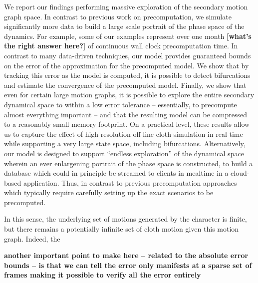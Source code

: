 We report our findings performing massive exploration of the secondary motion graph space. In contrast to previous work on precomputation, we simulate significantly more data to build a large scale portrait of the phase space of the dynamics. For example, some of our examples represent over one month \textbf{[what's the right answer here?]} of continuous wall clock precomputation time. In contrast to many data-driven techniques, our model provides guaranteed bounds on the error of the approximation for the precomputed model. We show that by tracking this error as the model is computed, it is possible to detect bifurcations and estimate the convergence of the precomputed model. Finally, we show that even for certain large motion graphs, it is possible to explore the entire secondary dynamical space to within a low error tolerance -- essentially, to precompute almost everything important -- and that the resulting model can be compressed to a reasonably small memory footprint. On a practical level, these results allow us to capture the effect of high-resolution off-line cloth simulation in real-time while supporting a very large state space, including bifurcations. Alternatively, our model is designed to support ``endless exploration'' of the dynamical space wherein an ever enlargening portrait of the phase space is constructed, to build a database which could in principle be streamed to clients in mealtime in a cloud-based application. Thus, in contrast to previous precomputation approaches which typically require carefully setting up the exact scenarios to be precomputed.

In this sense, the underlying set of motions generated by the character is finite, but there remains a potentially infinite set of cloth motion given this motion graph. Indeed, the 

\textbf{another important point to make here -- related to the absolute error bounds -- is that we can tell the error only manifests at a sparse set of frames making it possible to verify all the error entirely}

% 

%   
% 
% 

%     

% 
% 
